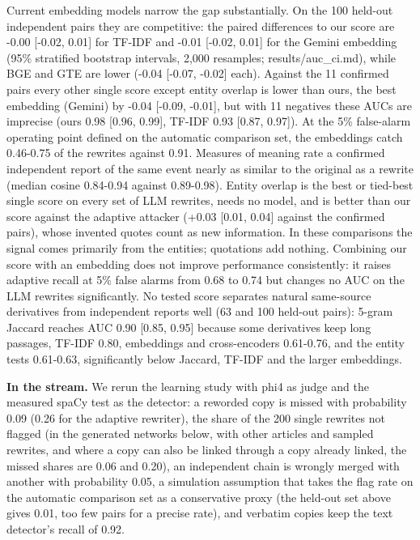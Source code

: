 Current embedding models narrow the gap substantially. On the 100 held-out independent pairs they are competitive: the paired differences to our score are -0.00 {[}-0.02, 0.01{]} for TF-IDF and -0.01 {[}-0.02, 0.01{]} for the Gemini embedding (95\% stratified bootstrap intervals, 2,000 resamples; results/auc\_ci.md), while BGE and GTE are lower (-0.04 {[}-0.07, -0.02{]} each). Against the 11 confirmed pairs every other single score except entity overlap is lower than ours, the best embedding (Gemini) by -0.04 {[}-0.09, -0.01{]}, but with 11 negatives these AUCs are imprecise (ours 0.98 {[}0.96, 0.99{]}, TF-IDF 0.93 {[}0.87, 0.97{]}). At the 5\% false-alarm operating point defined on the automatic comparison set, the embeddings catch 0.46-0.75 of the rewrites against 0.91. Measures of meaning rate a confirmed independent report of the same event nearly as similar to the original as a rewrite (median cosine 0.84-0.94 against 0.89-0.98). Entity overlap is the best or tied-best single score on every set of LLM rewrites, needs no model, and is better than our score against the adaptive attacker (+0.03 {[}0.01, 0.04{]} against the confirmed pairs), whose invented quotes count as new information. In these comparisons the signal comes primarily from the entities; quotations add nothing. Combining our score with an embedding does not improve performance consistently: it raises adaptive recall at 5\% false alarms from 0.68 to 0.74 but changes no AUC on the LLM rewrites significantly. No tested score separates natural same-source derivatives from independent reports well (63 and 100 held-out pairs): 5-gram Jaccard reaches AUC 0.90 {[}0.85, 0.95{]} because some derivatives keep long passages, TF-IDF 0.80, embeddings and cross-encoders 0.61-0.76, and the entity tests 0.61-0.63, significantly below Jaccard, TF-IDF and the larger embeddings.

\textbf{In the stream.} We rerun the learning study with phi4 as judge and the measured spaCy test as the detector: a reworded copy is missed with probability 0.09 (0.26 for the adaptive rewriter), the share of the 200 single rewrites not flagged (in the generated networks below, with other articles and sampled rewrites, and where a copy can also be linked through a copy already linked, the missed shares are 0.06 and 0.20), an independent chain is wrongly merged with another with probability 0.05, a simulation assumption that takes the flag rate on the automatic comparison set as a conservative proxy (the held-out set above gives 0.01, too few pairs for a precise rate), and verbatim copies keep the text detector's recall of 0.92.

